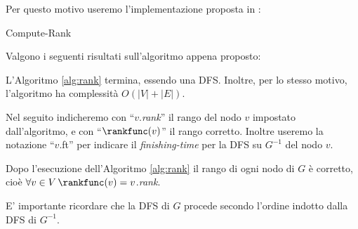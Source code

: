 Per questo motivo useremo l'implementazione proposta in \cite{dovier}:\\
\begin{algorithm}[H]
    \label{alg:rank}
    \caption{Compute-Rank}
\end{algorithm}

Valgono i seguenti risultati sull'algoritmo appena proposto:
\begin{observation}
    L'Algoritmo \ref{alg:rank} termina, essendo una DFS. Inoltre, per lo stesso motivo, l'algoritmo ha complessità $O(|V| + |E|)$.
\end{observation}
Nel seguito indicheremo con ``$v$.\emph{rank}'' il rango del nodo $v$ impostato dall'algoritmo, e con ``$\rankfunc(v)$'' il rango corretto. Inoltre useremo la notazione ``$v$.ft'' per indicare il \emph{finishing-time} per la DFS su $G^{-1}$ del nodo $v$.
\begin{theorem}
    \label{theo:rank_correct}
    Dopo l'esecuzione dell'Algoritmo \ref{alg:rank} il rango di ogni nodo di $G$ è corretto, cioè $\forall v \in V\, \rankfunc(v) = v$.\emph{rank}.
\end{theorem}
E' importante ricordare che la DFS di $G$ procede secondo l'ordine indotto dalla DFS di $G^{-1}$.

